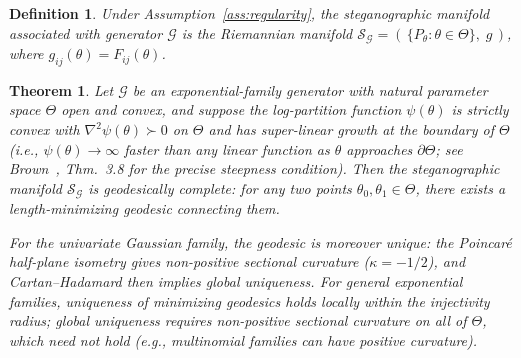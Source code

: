 \documentclass[a4paper,fleqn]{cas-dc}
\newtheorem{theorem}{Theorem}
\newtheorem{definition}{Definition}
\newcommand{\calS}{\mathcal{S}}
\newcommand{\calG}{\mathcal{G}}
\begin{document}
\begin{definition}%
  \label{def:stego_manifold}
  Under Assumption~\ref{ass:regularity}, the \emph{steganographic manifold}
  associated with generator $\calG$ is the Riemannian manifold
  $\calS_{\calG} = (\,\{P_\theta : \theta\in\Theta\},\; g\,)$,
  where $g_{ij}(\theta) = F_{ij}(\theta)$.
\end{definition}

\begin{theorem}%
  \label{thm:completeness}
  Let $\calG$ be an exponential-family generator with natural parameter
  space $\Theta$ open and convex, and suppose the log-partition function
  $\psi(\theta)$ is strictly convex with $\nabla^2\psi(\theta) \succ 0$
  on $\Theta$ and has \emph{super-linear growth} at the boundary of
  $\Theta$ (i.e., $\psi(\theta)\to\infty$ faster than any linear function
  as $\theta$ approaches $\partial\Theta$; see Brown~\cite{brown1986fundamentals},
  Thm.~3.8 for the precise steepness condition).
  Then the steganographic manifold $\calS_{\calG}$ is geodesically
  complete: for any two points $\theta_0, \theta_1 \in \Theta$, there
  exists a length-minimizing geodesic connecting them.

  For the univariate Gaussian family, the geodesic is moreover \emph{unique}:
  the Poincar\'{e} half-plane isometry gives non-positive sectional curvature
  ($\kappa = -1/2$), and Cartan--Hadamard then implies global uniqueness.
  For general exponential families, uniqueness of minimizing geodesics holds
  locally within the injectivity radius; global uniqueness requires
  non-positive sectional curvature on all of $\Theta$, which need not hold
  (e.g., multinomial families can have positive curvature).
\end{theorem}
\end{document}
